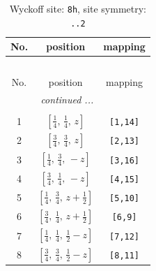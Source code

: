 \documentclass[fleqn,8pt]{jsarticle}
\begin{document}
\begin{longtable}{ccc}
\caption{Wyckoff site: {\tt 8h}, site symmetry: {\tt ..2}}
 \\
 \hline \hline
No. & position & mapping \\ \hline \endfirsthead

\multicolumn{2}{l}{\tablename\ \thetable{}} \\
 \hline \hline
No. & position & mapping \\ \hline \endhead

 \hline \hline
\multicolumn{2}{r}{\footnotesize\it continued ...} \\ \endfoot

 \hline \hline
\multicolumn{2}{r}{} \\ \endlastfoot

1 & $\left[ \frac{1}{4},\, \frac{1}{4},\, z \right]$ & {\tt [1,14]} \\ \hline
2 & $\left[ \frac{3}{4},\, \frac{3}{4},\, z \right]$ & {\tt [2,13]} \\ \hline
3 & $\left[ \frac{1}{4},\, \frac{3}{4},\, - z \right]$ & {\tt [3,16]} \\ \hline
4 & $\left[ \frac{3}{4},\, \frac{1}{4},\, - z \right]$ & {\tt [4,15]} \\ \hline
5 & $\left[ \frac{1}{4},\, \frac{3}{4},\, z + \frac{1}{2} \right]$ & {\tt [5,10]} \\ \hline
6 & $\left[ \frac{3}{4},\, \frac{1}{4},\, z + \frac{1}{2} \right]$ & {\tt [6,9]} \\ \hline
7 & $\left[ \frac{1}{4},\, \frac{1}{4},\, \frac{1}{2} - z \right]$ & {\tt [7,12]} \\ \hline
8 & $\left[ \frac{3}{4},\, \frac{3}{4},\, \frac{1}{2} - z \right]$ & {\tt [8,11]} \\
\end{longtable}
\renewcommand{\arraystretch}{1.2}
\end{document}
